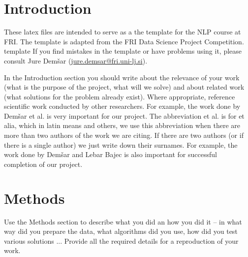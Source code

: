 \documentclass[fleqn,moreauthors,10pt]{ds_report}
\affiliation{\textit{Advisors: Aleš Žagar}}
\begin{document}
\flushbottom 

\maketitle 

\thispagestyle{empty} 


\section*{Introduction}
	These latex files are intended to serve as a the template for the NLP course at FRI.  The template is adapted from the FRI Data Science Project Competition. template  If you find mistakes in the template or have problems using it, please consult Jure Demšar (\href{mailto:jure.demsar@fri.uni-lj.si}{jure.demsar@fri.uni-lj.si}).
	
	In the Introduction section you should write about the relevance of your work (what is the purpose of the project, what will we solve) and about related work (what solutions for the problem already exist). Where appropriate, reference scientific work conducted by other researchers. For example, the work done by Demšar et al. \cite{Demsar2016BalancedMixture} is very important for our project. The abbreviation et al. is for et alia, which in latin means and others, we use this abbreviation when there are more than two authors of the work we are citing. If there are two authors (or if there is a single author) we just write down their surnames. For example, the work done by Demšar and Lebar Bajec \cite{Demsar2017LinguisticEvolution} is also important for successful completion of our project.



\section*{Methods}

Use the Methods section to describe what you did an how you did it -- in what way did you prepare the data, what algorithms did you use, how did you test various solutions ... Provide all the required details for a reproduction of your work.
\end{document}
